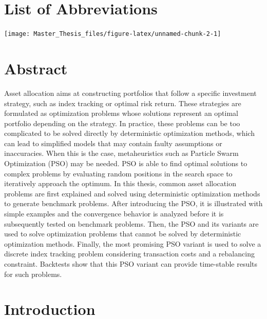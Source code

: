 \documentclass[
  oneside, a4paper, 12pt, openany]{book}
\author{}
\date{\vspace{-2.5em}}
\theoremstyle{definition}
\theoremstyle{definition}
\theoremstyle{definition}
\theoremstyle{definition}
\theoremstyle{remark}
\begin{document}

\newpage
\setcounter{page}{1}

{
\setcounter{tocdepth}{1}
\tableofcontents
}
\listoffigures

\hypertarget{list-of-abbreviations}{%
\chapter*{List of Abbreviations}\label{list-of-abbreviations}}

\texttt{[image: Master\_Thesis\_files/figure-latex/unnamed-chunk-2-1]}

\hypertarget{abstract}{%
\chapter*{Abstract}\label{abstract}}


Asset allocation aims at constructing portfolios that follow a specific investment strategy, such as index tracking or optimal risk return. These strategies are formulated as optimization problems whose solutions represent an optimal portfolio depending on the strategy. In practice, these problems can be too complicated to be solved directly by deterministic optimization methods, which can lead to simplified models that may contain faulty assumptions or inaccuracies. When this is the case, metaheuristics such as Particle Swarm Optimization (PSO) may be needed. PSO is able to find optimal solutions to complex problems by evaluating random positions in the search space to iteratively approach the optimum. In this thesis, common asset allocation problems are first explained and solved using deterministic optimization methods to generate benchmark problems. After introducing the PSO, it is illustrated with simple examples and the convergence behavior is analyzed before it is subsequently tested on benchmark problems. Then, the PSO and its variants are used to solve optimization problems that cannot be solved by deterministic optimization methods. Finally, the most promising PSO variant is used to solve a discrete index tracking problem considering transaction costs and a rebalancing constraint. Backtests show that this PSO variant can provide time-stable results for such problems.

\hypertarget{introduction}{%
\chapter{Introduction}\label{introduction}}
\end{document}
